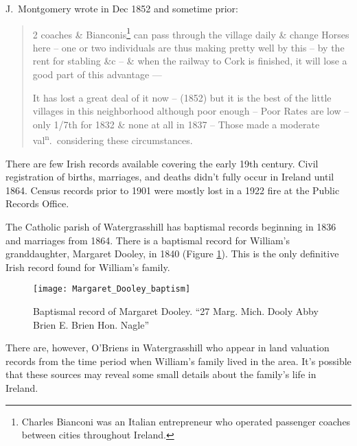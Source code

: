 J.\ Montgomery wrote in Dec 1852 and sometime prior:

\begin{quote}
	2 coaches \& Bianconis\footnote{Charles Bianconi was an Italian entrepreneur who operated passenger coaches between cities throughout Ireland.} can pass through the village daily \& change Horses here -- one or two individuals are thus making pretty well by this -- by the rent for stabling \&c -- \& when the railway to Cork is finished, it will lose a good part of this advantage ---
	
	It has lost a great deal of it now -- (1852) but it is the best of the little villages in this neighborhood although poor enough -- Poor Rates are low -- only 1/7th for 1832 \& none at all in 1837 -- Those made a moderate val\textsuperscript{n}.\ considering these circumstances.\cite{HouseIntro:2}
\end{quote}

There are few Irish records available covering the early 19th century. Civil registration of births, marriages, and deaths didn't fully occur in Ireland until 1864.\cite{Grenham:1} Census records prior to 1901 were mostly lost in a 1922 fire at the Public Records Office.\cite{Grenham:18} 

The Catholic parish of Watergrasshill has baptismal records beginning in 1836 and marriages from 1864.\cite{ParishRecords} There is a baptismal record for William's granddaughter, Margaret Dooley, in 1840 (Figure \ref{fig:DooleyBaptism}). This is the only definitive Irish record found for William's family.\cite{Margaret3DooleyBaptism2}

\begin{figure}[htbp]
	\centering
	\texttt{[image: Margaret\_Dooley\_baptism]}
	\caption{Baptismal record of Margaret Dooley. ``27 Marg. Mich. Dooly Abby Brien E. Brien Hon. Nagle''}
	\label{fig:DooleyBaptism}
\end{figure}

There are, however, O'Briens in Watergrasshill who appear in land valuation records from the time period when William's family lived in the area. It's possible that these sources may reveal some small details about the family's life in Ireland.

